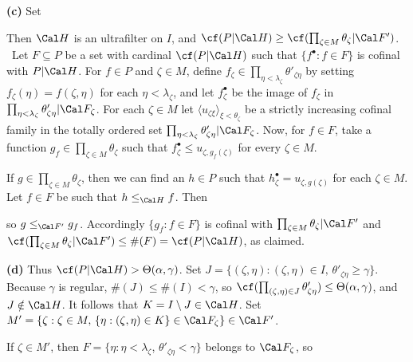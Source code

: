 {
{\bf (c)} Set




\noindent Then $\Cal H$ is an ultrafilter on $I$, and
$\cf(P|\Cal H)\ge\cf(\prod_{\zeta\in M}\theta_{\zeta}|\Cal F')$.
\Prf\ Let $F\subseteq P$ be a set with cardinal $\cf(P|\Cal H)$ such
that
$\{f^{\bullet}:f\in F\}$ is cofinal with $P|\Cal H$.   For
$f\in P$ and $\zeta\in M$, define
$f_{\zeta}\in\prod_{\eta<\lambda_{\zeta}}\theta'_{\zeta\eta}$
by setting $f_{\zeta}(\eta)=f(\zeta,\eta)$ for each
$\eta<\lambda_{\zeta}$, and let $f_{\zeta}^{\bullet}$ be the image of
$f_{\zeta}$ in
$\prod_{\eta<\lambda_{\zeta}}\theta'_{\zeta\eta}|\Cal F_{\zeta}$.
For each $\zeta\in M$ let
$\langle u_{\zeta\xi}\rangle_{\xi<\theta_{\zeta}}$ be a strictly
increasing cofinal family in the totally ordered set
$\prod_{\eta<\lambda_{\zeta}}\theta'_{\zeta\eta}|\Cal F_{\zeta}$.
Now, for $f\in F$, take a function
$g_{f}\in\prod_{\zeta\in M}\theta_{\zeta}$
such that $f_{\zeta}^{\bullet}\le u_{\zeta,g_f(\zeta)}$ for every
$\zeta\in M$.

If $g\in\prod_{\zeta\in M}\theta_{\zeta}$, then we can find an $h\in
P$
such that $h_{\zeta}^{\bullet}=u_{\zeta,g(\zeta)}$ for each
$\zeta\in M$.   Let $f\in F$ be such that $h\le_{\Cal H}f$.
Then


\noindent so $g\le_{\Cal F'}g_f$.
Accordingly $\{g_f:f\in F\}$ is cofinal with
$\prod_{\zeta\in M}\theta_{\zeta}|\Cal F'$ and
$\cf(\prod_{\zeta\in M}\theta_{\zeta}|\Cal F')\le\#(F)=\cf(P|\Cal
H)$, as
claimed.\ \Qed

\medskip

{\bf (d)} Thus $\cf(P|\Cal H)>\Theta(\alpha,\gamma)$.   Set
$J=\{(\zeta,\eta):(\zeta,\eta)\in I,\,\theta'_{\zeta\eta}\ge\gamma\}$.
Because $\gamma$ is regular, $\#(J)\le\#(I)<\gamma$, so
$\cf(\prod_{(\zeta,\eta)\in J}\theta'_{\zeta\eta})
\le\Theta(\alpha,\gamma)$, and $J\notin\Cal H$.   It follows that
$K=I\setminus J\in\Cal H$.   Set
$M'=\{\zeta:\zeta\in M,\,\{\eta:(\zeta,\eta)\in K\}\in\Cal F_{\zeta}\}
\in\Cal F'$.

If $\zeta\in M'$, then $F=\{\eta:\eta<\lambda_{\zeta}$,
$\theta'_{\zeta\eta}<\gamma\}$ belongs to $\Cal F_{\zeta}$, so

}
